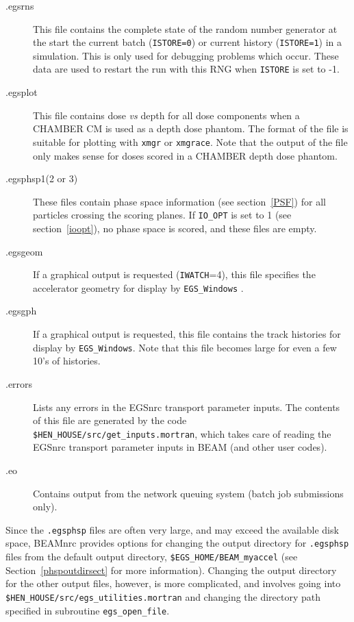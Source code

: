 \documentclass[12pt,twoside]{article}
\begin{document}
\begin{description}
\item [.egsrns]
This file contains the complete state of the random number generator
at the start the current batch
(\verb+ISTORE=0+) or current history (\verb+ISTORE=1+) in a simulation.
This is only used for debugging problems which occur.
These data are used to restart the run with this RNG
when \verb+ISTORE+ is set to -1.

\item [.egsplot]
This file contains dose {\em vs} depth for all dose components when a
CHAMBER CM is used as a depth dose phantom.  The format of the file is suitable
for plotting with {\tt xmgr} or {\tt xmgrace}.  Note that the output
of the file only makes sense for doses scored in a CHAMBER depth dose
phantom.   

\item [.egsphsp1(2 or 3)]
These files contain phase space information (see section~\ref{PSF})
for all particles
crossing the scoring planes. If
\verb+IO_OPT+ is set to 1 (see section~\ref{ioopt}),
no phase space is scored, and these files are empty.

\item [.egsgeom]  If a graphical output is requested ({\tt IWATCH}=4), this
file specifies the accelerator geometry for display by {\tt EGS\_Windows}
\cite{TR99a}.

\item [.egsgph] If a graphical output is requested, this file contains
the track histories for display by {\tt EGS\_Windows}.  Note that this file
becomes large for even a few 10's of histories.

\item [.errors] Lists any errors in the EGSnrc transport parameter
inputs.  The contents of this file are generated by the code
{\tt \$HEN\_HOUSE/src/get\_inputs.mortran}, which takes care of reading
the EGSnrc transport parameter inputs in BEAM (and other user codes).

\item [.eo] Contains output from the network queuing system (batch job
submissions only).

\end{description}

Since the {\tt .egsphsp} files are often very large, and may exceed the
available disk space, BEAMnrc provides options for changing the output
directory for {\tt .egsphsp} files from the default
output directory, {\tt \$EGS\_HOME/BEAM\_myaccel}
(see Section~\ref{phspoutdirsect} for more information).
Changing the output directory for the other output files, however, is
more complicated, and involves
going into {\tt \$HEN\_HOUSE/src/egs\_utilities.mortran} and changing
the directory path specified in subroutine {\tt egs\_open\_file}.
\end{document}
